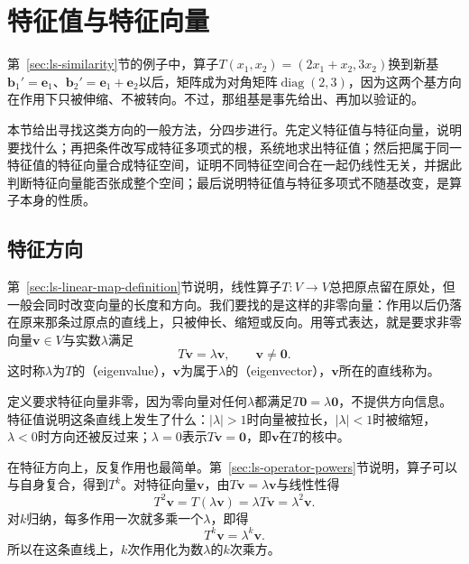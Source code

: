 
\section{特征值与特征向量}
\label{sec:ls-linear-operators}

第~\ref{sec:ls-similarity}节的例子中，算子$T(x_1,x_2)=(2x_1+x_2,3x_2)$换到新基$\bm b_1'=\bm e_1$、$\bm b_2'=\bm e_1+\bm e_2$以后，矩阵成为对角矩阵$\operatorname{diag}(2,3)$，因为这两个基方向在作用下只被伸缩、不被转向。不过，那组基是事先给出、再加以验证的。

本节给出寻找这类方向的一般方法，分四步进行。先定义特征值与特征向量，说明要找什么；再把条件改写成特征多项式的根，系统地求出特征值；然后把属于同一特征值的特征向量合成特征空间，证明不同特征空间合在一起仍线性无关，并据此判断特征向量能否张成整个空间；最后说明特征值与特征多项式不随基改变，是算子本身的性质。

\subsection{特征方向}
\label{sec:ls-operator-eigenvectors}

第~\ref{sec:ls-linear-map-definition}节说明，线性算子$T:V\to V$总把原点留在原处，但一般会同时改变向量的长度和方向。我们要找的是这样的非零向量：作用以后仍落在原来那条过原点的直线上，只被伸长、缩短或反向。用等式表达，就是要求非零向量$\bm v\in V$与实数$\lambda$满足
\begin{equation}
T\bm v=\lambda\bm v,\qquad\bm v\neq\bm0.
\label{eq:matrix-analysis-eigenpair}
\end{equation}
这时称$\lambda$为$T$的（eigenvalue），$\bm v$为属于$\lambda$的（eigenvector），$\bm v$所在的直线称为。

定义要求特征向量非零，因为零向量对任何$\lambda$都满足$T\bm0=\lambda\bm0$，不提供方向信息。特征值说明这条直线上发生了什么：$|\lambda|>1$时向量被拉长，$|\lambda|<1$时被缩短，$\lambda<0$时方向还被反过来；$\lambda=0$表示$T\bm v=\bm0$，即$\bm v$在$T$的核中。

在特征方向上，反复作用也最简单。第~\ref{sec:ls-operator-powers}节说明，算子可以与自身复合，得到$T^k$。对特征向量$\bm v$，由$T\bm v=\lambda\bm v$与线性性得
\[
 T^2\bm v=T(\lambda\bm v)=\lambda T\bm v=\lambda^2\bm v .
\]
对$k$归纳，每多作用一次就多乘一个$\lambda$，即得
\[
 T^k\bm v=\lambda^k\bm v .
\]
所以在这条直线上，$k$次作用化为数$\lambda$的$k$次乘方。

